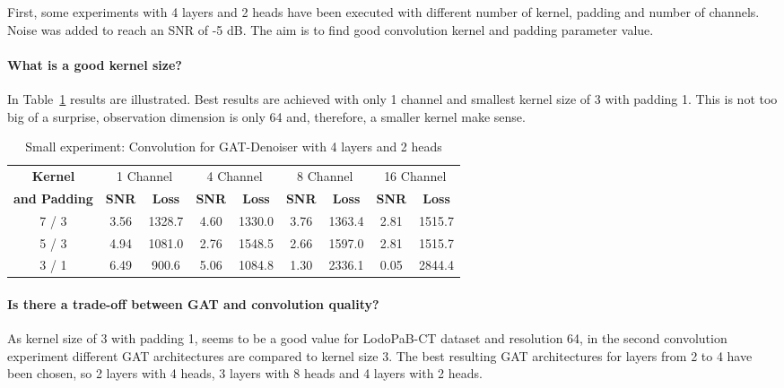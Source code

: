 First, some experiments with 4 layers and 2 heads have been executed with different number of kernel, padding and number of channels.
Noise was added to reach an SNR of -5 dB.
The aim is to find good convolution kernel and padding parameter value.

\paragraph{What is a good kernel size?}

In Table~\ref{tab:small_convolution} results are illustrated. 
Best results are achieved with only 1 channel and smallest kernel size of 3 with padding 1.
This is not too big of a surprise, observation dimension is only 64 and, therefore, a smaller kernel make sense.


\begin{table}[H]
  \centering
  \begin{tabular}{c|cc|cc|cc|cc}
    \toprule
    \textbf{Kernel}  & \multicolumn{2}{c|}{1 Channel} & \multicolumn{2}{c|}{4 Channel} & \multicolumn{2}{c|}{8 Channel} & \multicolumn{2}{c}{16 Channel} \\
    \textbf{and Padding}  & \textbf{SNR} & \textbf{Loss} & \textbf{SNR} & \textbf{Loss} & \textbf{SNR} & \textbf{Loss} & \textbf{SNR} & \textbf{Loss} \\ 
    \midrule
      7 / 3 & 3.56 & 1328.7 & 4.60  &  1330.0 & 3.76 & 1363.4 & 2.81  & 1515.7 \\ \hline
      5 / 3 & 4.94 & 1081.0 & 2.76  &  1548.5 & 2.66 & 1597.0 & 2.81  & 1515.7 \\ \hline
      3 / 1 & 6.49 & 900.6  & 5.06  &  1084.8 & 1.30 & 2336.1 & 0.05  & 2844.4 \\

    \midrule
  \end{tabular}

  \caption{Small experiment: Convolution for GAT-Denoiser with 4 layers and 2 heads}
  \label{tab:small_convolution}
\end{table}

\paragraph{Is there a trade-off between GAT and convolution quality?}

As kernel size of 3 with padding 1, seems to be a good value for LodoPaB-CT dataset and resolution 64, 
in the second convolution experiment different GAT architectures are compared to kernel size 3.
The best resulting GAT architectures for layers from 2 to 4 have been chosen, so 2 layers with 4 heads, 3 layers with 8 heads
and 4 layers with 2 heads.

